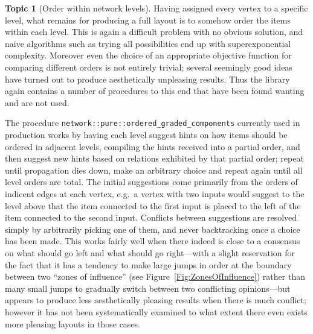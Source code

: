 \documentclass{article}
\theoremstyle{definition}
\newtheorem{topic}{Topic}
\begin{document}
\begin{topic}[Order within network levels] \label{Topic:LevelOrder}
  Having assigned every vertex to a specific level, what remains for 
  producing a full layout is to somehow order the items within each 
  level. This is again a difficult problem with no obvious solution, 
  and naive algorithms such as trying all possibilities end up with 
  superexponential complexity. Moreover even the choice of an 
  appropriate objective function for comparing different orders is 
  not entirely trivial; several seemingly good ideas have turned out 
  to produce aesthetically unpleasing results. Thus the library again 
  contains a number of procedures to this end that have been found 
  wanting and are not used.
  
  The procedure \verb|network::pure::ordered_graded_components| 
  currently used in production works by having each level suggest 
  hints on how items should be ordered in adjacent levels, compiling 
  the hints received into a partial order, and then suggest new hints 
  based on relations exhibited by that partial order; repeat until 
  propagation dies down, make an arbitrary choice and repeat again 
  until all level orders are total. The initial suggestions come 
  primarily from the orders of indicent edges at each vertex, e.g.~a 
  vertex with two inputs would suggest to the level above that the 
  item connected to the first input is placed to the left of the item 
  connected to the second input. Conflicts between suggestions are 
  resolved simply by arbitrarily picking one of them, and never 
  backtracking once a choice has been made. This works fairly well 
  when there indeed is close to a consensus on what should go left 
  and what should go right---with a slight reservation for the fact 
  that it has a tendency to make large jumps in order at the boundary 
  between two ``zones of influence'' (see 
  Figure~\ref{Fig:ZonesOfInfluence}) rather than many small 
  jumps to gradually switch between two conflicting opinions---but 
  appears to produce less aesthetically pleasing results when there 
  is much conflict; however it has not been systematically examined 
  to what extent there even exists more pleasing layouts in those 
  cases.
  

\end{topic}
\end{document}
